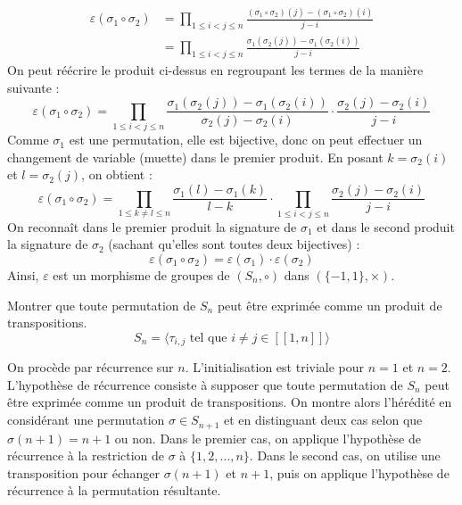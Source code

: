 \documentclass[11pt, a4paper]{article}
\theoremstyle{definition}
\begin{document}
\begin{align*}
	\varepsilon(\sigma_1 \circ \sigma_2) &= \prod_{1 \le i < j \le n} \frac{(\sigma_1 \circ \sigma_2)(j) - (\sigma_1 \circ \sigma_2)(i)}{j - i} \\
	&= \prod_{1 \le i < j \le n} \frac{\sigma_1(\sigma_2(j)) - \sigma_1(\sigma_2(i))}{j - i}
\end{align*}
On peut réécrire le produit ci-dessus en regroupant les termes de la manière suivante :
\[
\varepsilon(\sigma_1 \circ \sigma_2) = \prod_{1 \le i < j \le n} \frac{\sigma_1(\sigma_2(j)) - \sigma_1(\sigma_2(i))}{\sigma_2(j) - \sigma_2(i)} \cdot \frac{\sigma_2(j) - \sigma_2(i)}{j - i}
\]
Comme $\sigma_1$ est une permutation, elle est bijective, donc on peut effectuer un changement de variable (muette) dans le premier produit. En posant $k = \sigma_2(i)$ et $l = \sigma_2(j)$, on obtient :
\[
\varepsilon(\sigma_1 \circ \sigma_2) = \prod_{1 \le k \ne l \le n} \frac{\sigma_1(l) - \sigma_1(k)}{l - k} \cdot \prod_{1 \le i < j \le n} \frac{\sigma_2(j) - \sigma_2(i)}{j - i}
\]
On reconnaît dans le premier produit la signature de $\sigma_1$ et dans le second produit la signature de $\sigma_2$ (sachant qu'elles sont toutes deux bijectives) :
\[
\varepsilon(\sigma_1 \circ \sigma_2) = \varepsilon(\sigma_1) \cdot \varepsilon(\sigma_2)
\]
Ainsi, $\varepsilon$ est un morphisme de groupes de $(S_n, \circ)$ dans $(\{-1, 1\}, \times)$.

\clearpage

\begin{tcolorbox}[instructionstyle]
	Montrer que toute permutation de $S_n$ peut être exprimée comme un produit de transpositions.
	$$S_n = \langle \tau_{i,j} \text{ tel que } i \ne j \in [\![1,n]\!] \rangle$$
\end{tcolorbox}

\begin{tcolorbox}[methodstyle]
	On procède par récurrence sur $n$. L'initialisation est triviale pour $n=1$ et $n=2$. L'hypothèse de récurrence consiste à supposer que toute permutation de $S_n$ peut être exprimée comme un produit de transpositions. On montre alors l'hérédité en considérant une permutation $\sigma \in S_{n+1}$ et en distinguant deux cas selon que $\sigma(n+1) = n+1$ ou non. Dans le premier cas, on applique l'hypothèse de récurrence à la restriction de $\sigma$ à $\{1, 2, \dots, n\}$. Dans le second cas, on utilise une transposition pour échanger $\sigma(n+1)$ et $n+1$, puis on applique l'hypothèse de récurrence à la permutation résultante.
\end{tcolorbox}
\end{document}
